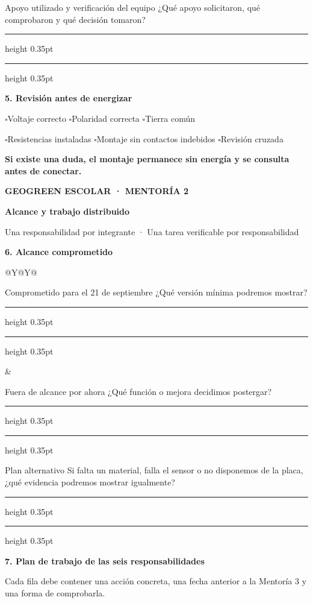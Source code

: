 \documentclass[10pt,a4paper]{article}
\newcommand{\writearea}[1]{\vspace{#1}\hrule height 0.35pt\vspace{4mm}\hrule height 0.35pt}
\newcommand{\checkline}[1]{$\square$\hspace{1.5mm}#1}
\newcommand{\pagehead}[2]{%
  {\small\bfseries\textcolor{AIEPRed}{GEOGREEN ESCOLAR · MENTORÍA 2}}\par
  \vspace{2mm}
  {\LARGE\bfseries\color{AIEPNavy}#1\par}
  {\normalsize\color{AIEPMuted}#2\par}
  \vspace{4mm}
}
\begin{document}
\begin{fieldbox}[height=25mm]{Apoyo utilizado y verificación del equipo}
¿Qué apoyo solicitaron, qué comprobaron y qué decisión tomaron?
\writearea{4mm}
\end{fieldbox}

{\large\bfseries\color{AIEPNavy}5. Revisión antes de energizar}\par
\begin{tcolorbox}[colback=AIEPNavy,colframe=AIEPNavy,coltext=white,boxrule=0pt,arc=1mm,left=3mm,right=3mm,top=2.5mm,bottom=2.5mm]
\checkline{Voltaje correcto}\hspace{5mm}
\checkline{Polaridad correcta}\hspace{5mm}
\checkline{Tierra común}\par
\checkline{Resistencias instaladas}\hspace{5mm}
\checkline{Montaje sin contactos indebidos}\hspace{5mm}
\checkline{Revisión cruzada}\par
\vspace{1.5mm}
\textbf{Si existe una duda, el montaje permanece sin energía y se consulta antes de conectar.}
\end{tcolorbox}

\newpage
\pagehead{Alcance y trabajo distribuido}{Una responsabilidad por integrante · Una tarea verificable por responsabilidad}

{\large\bfseries\color{AIEPNavy}6. Alcance comprometido}\par
\begin{tabularx}{\textwidth}{@{}Y@{\hspace{4mm}}Y@{}}
\begin{accentfield}[height=33mm]{Comprometido para el 21 de septiembre}
¿Qué versión mínima podremos mostrar?
\writearea{9mm}
\end{accentfield}
&
\begin{fieldbox}[height=33mm]{Fuera de alcance por ahora}
¿Qué función o mejora decidimos postergar?
\writearea{9mm}
\end{fieldbox}
\end{tabularx}

\begin{fieldbox}[height=28mm]{Plan alternativo}
Si falta un material, falla el sensor o no disponemos de la placa, ¿qué evidencia podremos mostrar igualmente?
\writearea{5mm}
\end{fieldbox}

{\large\bfseries\color{AIEPNavy}7. Plan de trabajo de las seis responsabilidades}\par
{\footnotesize Cada fila debe contener una acción concreta, una fecha anterior a la Mentoría 3 y una forma de comprobarla.}
\end{document}

